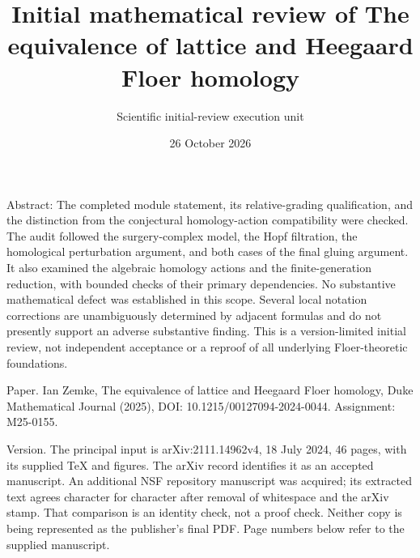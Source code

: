 \documentclass[10pt]{article}
\title{Initial mathematical review of
The equivalence of lattice and Heegaard Floer homology}
\author{Scientific initial-review execution unit}
\date{26 October 2026}
\begin{document}
\maketitle
Abstract: The completed module statement, its relative-grading qualification, and the distinction from the conjectural homology-action compatibility were checked. The audit followed the surgery-complex model, the Hopf filtration, the homological perturbation argument, and both cases of the final gluing argument. It also examined the algebraic homology actions and the finite-generation reduction, with bounded checks of their primary dependencies. No substantive mathematical defect was established in this scope. Several local notation corrections are unambiguously determined by adjacent formulas and do not presently support an adverse substantive finding. This is a version-limited initial review, not independent acceptance or a reproof of all underlying Floer-theoretic foundations.\par
Paper. Ian Zemke, The equivalence of lattice and Heegaard Floer homology, Duke Mathematical Journal (2025), DOI: 10.1215/00127094-2024-0044. Assignment: M25-0155.\par
Version. The principal input is arXiv:2111.14962v4, 18 July 2024, 46 pages, with its supplied TeX and figures. The arXiv record identifies it as an accepted manuscript. An additional NSF repository manuscript was acquired; its extracted text agrees character for character after removal of whitespace and the arXiv stamp. That comparison is an identity check, not a proof check. Neither copy is being represented as the publisher’s final PDF. Page numbers below refer to the supplied manuscript.\par
\end{document}
